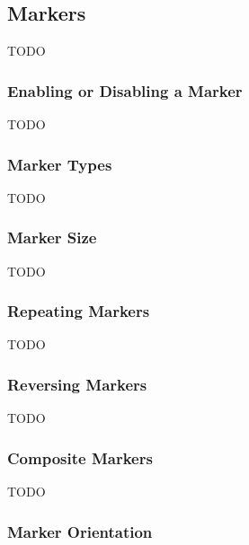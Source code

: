 \subsection{Markers}\label{sec:markers}

TODO


\subsubsection{Enabling or Disabling a Marker}\label{sec:enablingmarkers}

TODO


\subsubsection{Marker Types}\label{sec:markertypes}


TODO


\subsubsection{Marker Size}\label{sec:markersize}


TODO


\subsubsection{Repeating Markers}\label{sec:repeatingmarkers}


TODO


\subsubsection{Reversing Markers}\label{sec:reversingmarkers}


TODO


\subsubsection{Composite Markers}\label{sec:compositemarkers}


TODO


\subsubsection{Marker Orientation}\label{sec:markerorientation}


